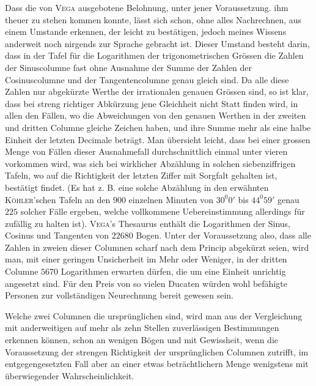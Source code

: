 Dass die von \textsc{Vega} ausgebotene Belohnung, unter jener Voraussetzung. ihm
theuer zu stehen kommen konnte, lässt sich schon, ohne alles Nachrechnen, aus
einem Umstande erkennen, der leicht zu bestätigen, jedoch meines Wissens anderweit noch nirgends zur Sprache gebracht ist. Dieser Umstand besteht darin,
dass in der Tafel für die Logarithmen der trigonometrischen Grössen die Zahlen
der Sinuscolumne fast ohne Ausnahme der Summe der Zahlen der Cosinuscolumne und der Tangentencolumne genau gleich sind. Da alle diese Zahlen nur
abgekürzte Werthe der irrationalen genauen Grössen sind, so ist klar, dass bei
streng richtiger Abkürzung jene Gleichheit nicht Statt finden wird, in allen den
Fällen, wo die Abweichungen von den genauen Werthen in der zweiten und dritten Columne gleiche Zeichen haben, und ihre Summe mehr als eine halbe Einheit der letzten Decimale beträgt. Man übersieht leicht, dass bei einer grossen
Menge von Fällen dieser Ausnahmefall durchschnittlich einmal unter vieren vorkommen wird, was sich bei wirklicher Abzählung in solchen siebenziffrigen Tafeln, wo auf die Richtigkeit der letzten Ziffer mit Sorgfalt gehalten ist, bestätigt
findet. (Es hat z. B. eine solche Abzählung in den erwähnten \textsc{Köhler}'schen Tafeln an den \(900\) einzelnen Minuten von \(30^{0}0'\) bis \(44^{0}59'\) genau \(225\) solcher Fälle
ergeben, welche vollkommene Uebereinstimmung allerdings für zufällig zu halten ist). \textsc{Vega}'s Thesaurus enthält die Logarithmen der Sinus, Cosinus und Tangenten von \(22680\) Bogen. Unter der Voraussetzung also, dass alle Zahlen in
zweien dieser Columnen scharf nach dem Princip abgekürzt seien, wird man, mit
einer geringen Unsicherheit im Mehr oder Weniger, in der dritten Columne \(5670\)
Logarithmen erwarten dürfen, die um eine Einheit unrichtig angesetzt sind. Für
den Preis von so vielen Ducaten würden wohl befähigte Personen zur vollständigen Neurechnung bereit gewesen sein.

Welche zwei Columnen die ursprünglichen sind, wird man aus der Vergleichung mit anderweitigen auf mehr als zehn Stellen zuverlässigen Bestimmungen erkennen können, schon an wenigen Bögen und mit Gewissheit, wenn die
Voraussetzung der strengen Richtigkeit der ursprünglichen Columnen zutrifft, im
entgegengesetzten Fall aber an einer etwas beträchtlichern Menge wenigstens mit
überwiegender Wahrscheinlichkeit.

